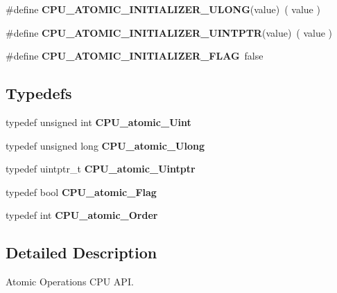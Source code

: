 \begin{DoxyCompactItemize}
\#define {\bfseries C\+P\+U\+\_\+\+A\+T\+O\+M\+I\+C\+\_\+\+I\+N\+I\+T\+I\+A\+L\+I\+Z\+E\+R\+\_\+\+U\+L\+O\+NG}(value)~( value )
\item 
\mbox{\label{group__RTEMSScoreCPUAtomic_ga61ee3dea46372f73826b92dfe44c8459}} 
\#define {\bfseries C\+P\+U\+\_\+\+A\+T\+O\+M\+I\+C\+\_\+\+I\+N\+I\+T\+I\+A\+L\+I\+Z\+E\+R\+\_\+\+U\+I\+N\+T\+P\+TR}(value)~( value )
\item 
\mbox{\label{group__RTEMSScoreCPUAtomic_gacc845516cb0ffa165d8d7ee5aa6fe382}} 
\#define {\bfseries C\+P\+U\+\_\+\+A\+T\+O\+M\+I\+C\+\_\+\+I\+N\+I\+T\+I\+A\+L\+I\+Z\+E\+R\+\_\+\+F\+L\+AG}~false
\end{DoxyCompactItemize}
\subsection*{Typedefs}
\begin{DoxyCompactItemize}
\item 
\mbox{\label{group__RTEMSScoreCPUAtomic_gacbfeadc59435c4500a6c169ab3dc1c65}} 
typedef unsigned int {\bfseries C\+P\+U\+\_\+atomic\+\_\+\+Uint}
\item 
\mbox{\label{group__RTEMSScoreCPUAtomic_ga2bee02917b455ae0f6ac058b9d52c88c}} 
typedef unsigned long {\bfseries C\+P\+U\+\_\+atomic\+\_\+\+Ulong}
\item 
\mbox{\label{group__RTEMSScoreCPUAtomic_ga81a24df2fa0eb215f7f724e6fc84baa5}} 
typedef uintptr\+\_\+t {\bfseries C\+P\+U\+\_\+atomic\+\_\+\+Uintptr}
\item 
\mbox{\label{group__RTEMSScoreCPUAtomic_gaf4abe6bbd4f87724f2cba5192ded1ab9}} 
typedef bool {\bfseries C\+P\+U\+\_\+atomic\+\_\+\+Flag}
\item 
\mbox{\label{group__RTEMSScoreCPUAtomic_gaa803277d8f7fe081f31bf841aa6b5b83}} 
typedef int {\bfseries C\+P\+U\+\_\+atomic\+\_\+\+Order}
\end{DoxyCompactItemize}


\subsection{Detailed Description}
Atomic Operations C\+PU A\+PI. 

